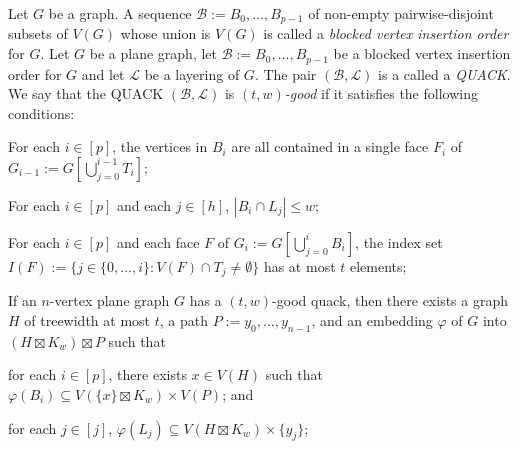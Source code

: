 \documentclass{patmorin}
\newcommand{\defin}[1]{\emph{\textcolor{brightmaroon}{#1}}}
\DeclareMathOperator{\spn}{span}
\begin{document}
Let $G$ be a graph.  A sequence $\mathcal{B}:=B_0,\ldots,B_{p-1}$ of non-empty pairwise-disjoint subsets of $V(G)$ whose union is $V(G)$ is called a \defin{blocked vertex insertion order} for $G$. Let $G$ be a plane graph, let $\mathcal{B}:=B_0,\ldots,B_{p-1}$ be a blocked vertex insertion order for $G$ and let $\mathcal{L}$ be a layering of $G$.   The pair $(\mathcal{B},\mathcal{L})$ is a called a \defin{QUACK}.  We say that  the QUACK $(\mathcal{B},\mathcal{L})$ is \defin{$(t,w)$-good} if it satisfies the following conditions:
\begin{compactenum}[({good}-a)]
  \item For each $i\in[p]$, the vertices in $B_i$ are all contained in a single face $F_i$ of $G_{i-1}:=G[\bigcup_{j=0}^{i-1} T_i]$;
  \item For each $i\in[p]$ and each $j\in[h]$, $|B_i\cap L_j|\le w$;
  \item For each $i\in[p]$ and each face $F$ of $G_i:=G[\bigcup_{j=0}^i B_i]$, the index set $I(F):=\{j\in\{0,\ldots,i\}:V(F)\cap T_j\neq\emptyset\}$ has at most $t$ elements;
\end{compactenum}

\begin{lem}\label{tw_good_quack}
  If an $n$-vertex plane graph $G$ has a $(t,w)$-good quack, then there exists a graph $H$ of treewidth at most $t$, a path $P:=y_0,\ldots,y_{n-1}$, and an embedding $\varphi$ of $G$ into $(H\boxtimes K_w)\boxtimes P$ such that
  \begin{compactenum}[(i)]
    \item for each $i\in[p]$, there exists $x\in V(H)$ such that $\varphi(B_i)\subseteq V(\{x\}\boxtimes K_w)\times V(P)$; and
    \item for each $j\in[j]$, $\varphi(L_j)\subseteq V(H\boxtimes K_w)\times\{y_j\}$;
  \end{compactenum}
\end{lem}
\end{document}
